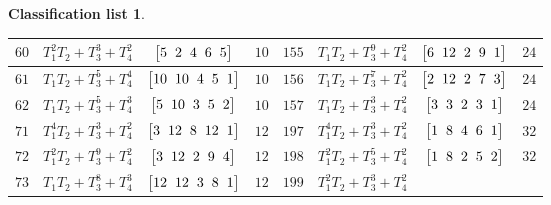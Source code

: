 \documentclass[pdftex]{sigma}%
\theoremstyle{definition}
\newtheorem{class-list}[thm]{Classification list}
\numberwithin{equation}{section}
\begin{document}
\begin{class-list}
\begin{table}[t!]
\begin{tabu}{c|c|c|c||c|c|c|c}
\\
\hline
${60}$&${T_{1}^{2}T_{2}+T_{3}^{3}+T_{4}^{2}}$
&$\arraycolsep=1mm\begin{bmatrix}{5} & {2} & {4} & {6} & {5}\end{bmatrix}$&${10}$
&${155}$&${T_{1}T_{2}+T_{3}^{9}+T_{4}^{2}}$
&$\arraycolsep=1mm\begin{bmatrix}{6} & {12} & {2} & {9} & {1}\end{bmatrix}$&${24}$
\\
\hline
${61}$&${T_{1}T_{2}+T_{3}^{5}+T_{4}^{4}}$
&$\arraycolsep=1mm\begin{bmatrix}{10} & {10} & {4} & {5} & {1}\end{bmatrix}$&${10}$
&${156}$&${T_{1}T_{2}+T_{3}^{7}+T_{4}^{2}}$
&$\arraycolsep=1mm\begin{bmatrix}{2} & {12} & {2} & {7} & {3}\end{bmatrix}$&${24}$
\\
\hline
${62}$&${T_{1}T_{2}+T_{3}^{5}+T_{4}^{3}}$
&$\arraycolsep=1mm\begin{bmatrix}{5} & {10} & {3} & {5} & {2}\end{bmatrix}$&${10}$
&${157}$&${T_{1}T_{2}+T_{3}^{3}+T_{4}^{2}}$
&$\arraycolsep=1mm\begin{bmatrix}{3} & {3} & {2} & {3} & {1}\end{bmatrix}$&${24}$
\\
\hline
${71}$&${T_{1}^{4}T_{2}+T_{3}^{3}+T_{4}^{2}}$
&$\arraycolsep=1mm\begin{bmatrix}{3} & {12} & {8} & {12} & {1}\end{bmatrix}$&${12}$
&${197}$&${T_{1}^{4}T_{2}+T_{3}^{3}+T_{4}^{2}}$
&$\arraycolsep=1mm\begin{bmatrix}{1} & {8} & {4} & {6} & {1}\end{bmatrix}$&${32}$
\\
\hline
${72}$&${T_{1}^{2}T_{2}+T_{3}^{9}+T_{4}^{2}}$
&$\arraycolsep=1mm\begin{bmatrix}{3} & {12} & {2} & {9} & {4}\end{bmatrix}$&${12}$
&${198}$&${T_{1}^{2}T_{2}+T_{3}^{5}+T_{4}^{2}}$
&$\arraycolsep=1mm\begin{bmatrix}{1} & {8} & {2} & {5} & {2}\end{bmatrix}$&${32}$
\\
\hline
${73}$&${T_{1}T_{2}+T_{3}^{8}+T_{4}^{3}}$
&$\arraycolsep=1mm\begin{bmatrix}{12} & {12} & {3} & {8} & {1}\end{bmatrix}$&${12}$
&${199}$&${T_{1}^{2}T_{2}+T_{3}^{3}+T_{4}^{2}}$

\end{tabu}
\end{table}
\end{class-list}
\end{document}
